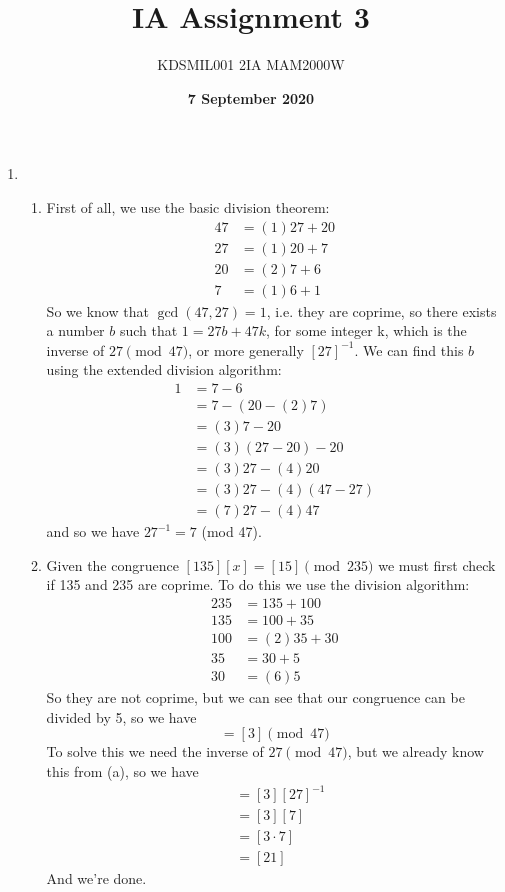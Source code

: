 \documentclass[12pt]{article}
\title{IA Assignment 3}
\author{KDSMIL001 \; 2IA MAM2000W}
\date{\textbf{7 September 2020}}
\numberwithin{equation}{section}
\numberwithin{figure}{section}
\begin{document}
    \maketitle
    \begin{enumerate}
        \item \begin{enumerate}
            \item First of all, we use the basic division theorem:
            \begin{align*}
                47&=(1)27+20\\
                27&=(1)20+7\\
                20&=(2)7+6\\
                7&=(1)6+1
            \end{align*}
            So we know that $\gcd(47,27)=1$, i.e. they are coprime, so there exists a number $b$ 
            such that $1=27b+47k$, for some integer k, which is the inverse of $27\pmod{47}$, or 
            more generally $[27]^{-1}$. We can find this $b$ using the extended division algorithm:
            \begin{align*}
                1&=7-6\\
                &=7-(20-(2)7)\\
                &=(3)7-20\\
                &=(3)(27-20)-20\\
                &=(3)27-(4)20\\
                &=(3)27-(4)(47-27)\\
                &=(7)27-(4)47
            \end{align*}
            and so we have $27^{-1}=7$ (mod 47).
            
            \item Given the congruence $[135][x]=[15]\pmod{235}$ we must first check if 135 and 235 
            are coprime. To do this we use the division algorithm:
            \begin{align*}
                235&=135+100\\
                135&=100+35\\
                100&=(2)35+30\\
                35&=30+5\\
                30&=(6)5
            \end{align*}
            So they are not coprime, but we can see that our congruence can be divided by 5, so we have 
            \begin{equation*}
                [27][x]=[3] \pmod{47}
            \end{equation*}
            To solve this we need the inverse of $27\pmod{47}$, but we already know this from (a), so we have 
            \begin{align*}
                [x]&=[3][27]^{-1}\\
                &=[3][7]\\
                &=[3\cdot7]\\
                &=[21]
            \end{align*}
            And we're done.
            

\end{enumerate}
\end{enumerate}
\end{document}
